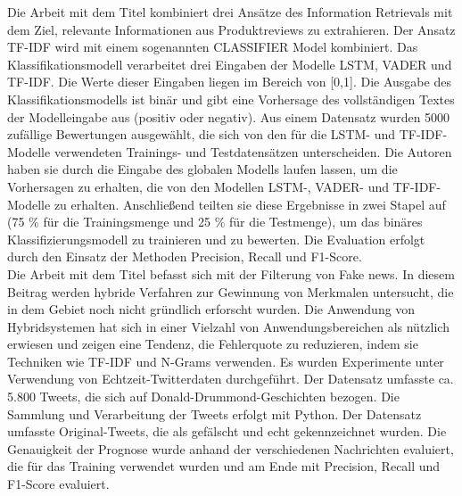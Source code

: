 Die Arbeit mit dem Titel \cite{chiny2021lstm} kombiniert drei Ansätze des Information Retrievals mit dem Ziel, relevante Informationen aus Produktreviews zu extrahieren. Der Ansatz TF-IDF wird mit einem sogenannten CLASSIFIER Model kombiniert. Das Klassifikationsmodell verarbeitet drei Eingaben der Modelle LSTM, VADER und TF-IDF. Die Werte dieser Eingaben liegen im Bereich von [0,1]. Die Ausgabe des Klassifikationsmodells ist binär und gibt eine Vorhersage des vollständigen Textes der Modelleingabe aus (positiv oder negativ). Aus einem Datensatz wurden 5000 zufällige Bewertungen ausgewählt, die sich von den für die LSTM- und TF-IDF-Modelle verwendeten Trainings- und Testdatensätzen unterscheiden. Die Autoren haben sie durch die Eingabe des globalen Modells laufen lassen, um die Vorhersagen zu erhalten, die von den Modellen LSTM-, VADER- und TF-IDF-Modelle zu erhalten. Anschließend teilten sie diese Ergebnisse in zwei Stapel auf (75 \% für die Trainingsmenge und 25 \% für die Testmenge), um das binäres Klassifizierungsmodell zu trainieren und zu bewerten. Die Evaluation erfolgt durch den Einsatz der Methoden Precision, Recall und F1-Score.\\

Die Arbeit mit dem Titel \cite{suhasini2021hybrid} befasst sich mit der Filterung von Fake news. In diesem Beitrag werden hybride Verfahren zur Gewinnung von Merkmalen untersucht, die in dem Gebiet noch nicht gründlich erforscht wurden. Die Anwendung von Hybridsystemen hat sich in einer Vielzahl von Anwendungsbereichen als nützlich erwiesen und zeigen eine Tendenz, die Fehlerquote zu reduzieren, indem sie Techniken wie TF-IDF und N-Grams verwenden. Es wurden Experimente unter Verwendung von Echtzeit-Twitterdaten durchgeführt. Der Datensatz umfasste ca. 5.800 Tweets, die sich auf Donald-Drummond-Geschichten bezogen. Die Sammlung und Verarbeitung der Tweets erfolgt mit Python. Der Datensatz umfasste Original-Tweets, die als gefälscht und echt gekennzeichnet wurden. Die Genauigkeit der Prognose wurde anhand der verschiedenen Nachrichten evaluiert, die für das Training verwendet wurden und am Ende mit Precision, Recall und F1-Score evaluiert.\\

